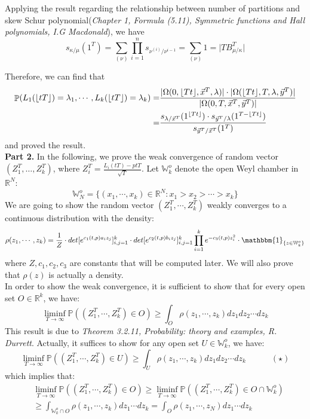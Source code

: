 \documentclass[12pt]{article}
\DeclareMathOperator{\pr}{\mathbb{P}}
\DeclarePairedDelimiter\floor{\lfloor}{\rfloor}
\begin{document}
Applying the result regarding the relationship between number of partitions and skew Schur polynomial(\emph{Chapter 1, Formula (5.11), Symmetric functions and Hall polynomials, I.G Macdonald}), we have \[s_{\kappa/\mu}(1^T)=\sum_{(\nu)}\prod_{i=1}^n s_{\nu^{(i)}/\nu^{i-1}}=\sum_{(\nu)} 1=\lvert TB_{\mu/\kappa}^T\rvert\]

Therefore, we can find that 
\begin{align*}
\pr(L_1(\lfloor tT\rfloor)=\lambda_1,\cdots, L_k(\lfloor tT\rfloor)=\lambda_k)
=&{}\frac{\lvert \Omega(0,\lfloor Tt\rfloor, \vec{x}^T, \lambda)\rvert\cdot \lvert \Omega(\lfloor Tt\rfloor ,T, \lambda, \vec{y}^T)\rvert}{\lvert \Omega(0, T, \vec{x}^T, \vec{y}^T)\rvert}\\
=&{}\frac{s_{\lambda/\vec{x}^T}(1^{\floor{Tt}})\cdot s_{\vec{y}^T/\lambda}(1^{T-\floor{Tt}})}{s_{\vec{y}^T/\vec{x}^T}(1^T)}
\end{align*} and proved the result.\\
\textbf{Part 2. } In the following, we prove the weak convergence of random vector $(Z_{1}^{T},\dots,Z_{k}^{T})$, where $Z_{i}^{T}=\frac{L_{i}(tT)-ptT}{\sqrt{T}}$. Let $\mathbb{W}_{k}^{o}$ denote the open Weyl chamber in $\mathbb{R}^{N}$:
$$\mathbb{W}_{N}^{o}=\{(x_{1},\cdots,x_{k})\in\mathbb{R}^{N}:x_{1}>x_{2}>\cdots>x_{k}\}$$ 
We are going to show the random vector $(Z_{1}^{T},\cdots,Z_{k}^{T})$ weakly converges to a continuous distribution with the density:
$$\rho(z_{1},\cdots,z_{k})=\frac{1}{Z}\cdot det[e^{c_1(t,p)a_{i}z_{j}}]_{i,j=1}^{k}\cdot det[e^{c_2(t,p)b_{i}z_{j}}]_{i,j=1}^{k}\prod_{i=1}^{k}e^{-c_{3}(t,p)z_{i}^{2}}\cdot \mathbbm{1}_{\{z\in \mathbb{W}_{k}^{o}\}}$$
where $Z,c_{1},c_{2},c_{3}$ are constants that will be computed later. We will also prove that $\rho(z)$ is actually a density.\\
In order to show the weak convergence, it is sufficient to show that for every open set $O\in\mathbb{R}^{k}$, we have: 
$$\liminf_{T\rightarrow\infty}\mathbb{P}((Z_{1}^{T},\cdots,Z_{k}^{T})\in O)\geqslant\int_{O}\rho(z_{1},\cdots,z_{k})dz_{1}dz_{2}\cdots dz_{k}$$
This result is due to \emph{Theorem 3.2.11, Probability: theory and examples, R. Durrett}. Actually, it suffices to show for any open set $U\in\mathbb{W}_{k}^{o}$, we have:
$$\liminf_{T\rightarrow\infty}\mathbb{P}((Z_{1}^{T},\cdots,Z_{k}^{T})\in U)\geqslant\int_{U}\rho(z_{1},\cdots,z_{k})dz_{1}dz_{2}\cdots dz_{k}\quad\quad\quad (\star)$$
which implies that:
\begin{align*}
	&\liminf_{T\rightarrow\infty}\mathbb{P}((Z_{1}^{T},\cdots,Z_{k}^{T})\in O)\geqslant\liminf_{T\rightarrow\infty}\mathbb{P}((Z_{1}^{T},\cdots,Z_{k}^{T})\in O\cap\mathbb{W}_{k}^{o})\\
	&\geqslant \int_{\mathbb{W}_{k}^{o}\cap O}\rho(z_{1},\cdots,z_{k})dz_{1}\cdots dz_{k}= \int_{O}\rho(z_{1},\cdots,z_{N})dz_{1}\cdots dz_{k}
\end{align*}
\end{document}
